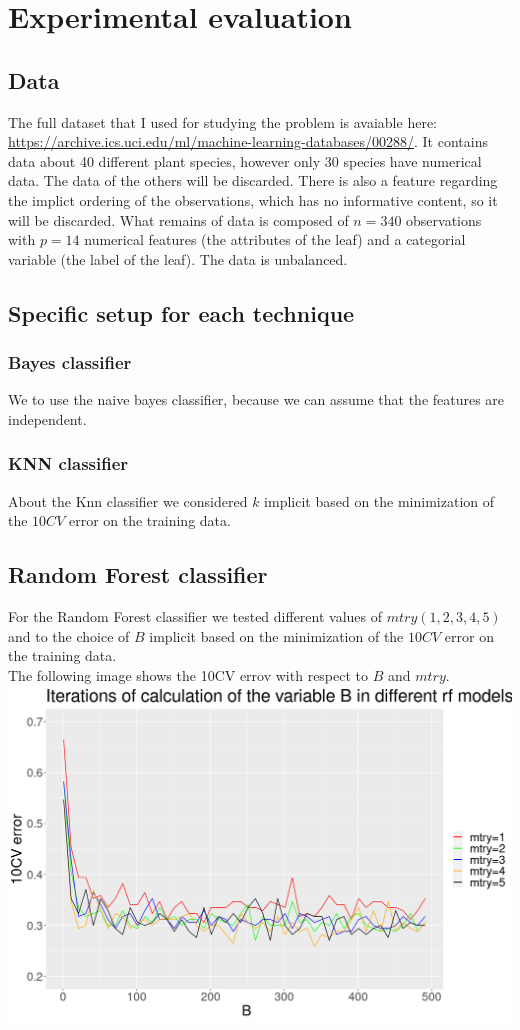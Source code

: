 \documentclass{article}
\begin{document}
\section{Experimental evaluation}

\subsection{Data}
The full dataset that I used for studying the problem is avaiable  here: \url{ https://archive.ics.uci.edu/ml/machine-learning-databases/00288/}.
It contains data about 40 different plant species, however only 30 species have numerical data. The data of the others will be discarded. There is also a feature regarding the implict ordering of the observations, which has no informative content, so it will be discarded.  What remains of data is composed of $n=340$ observations with $p=14$ numerical features (the attributes of the leaf) and a categorial variable (the label of the leaf).  The data is unbalanced.  


\subsection{Specific setup for each technique}
\subsubsection{Bayes classifier}
We to use the naive bayes classifier, because we can assume that the features are independent.
\subsubsection{KNN classifier}
About the Knn classifier we considered  $k$ implicit based on the minimization of the $10CV$ error on the training data.  

\subsection{Random Forest classifier}
For the Random Forest classifier we tested different values of $mtry (1,2,3,4,5)$  and to the choice of $B$ implicit  based on the minimization of the $10CV$ error on the training data.\\
The following image shows the 10CV errov with respect to $B$ and $mtry$.\\
\includegraphics[scale=0.30]{rf}
\end{document}
